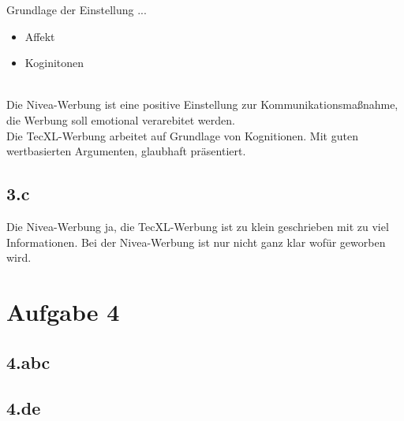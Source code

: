     Grundlage der Einstellung ... 
    \begin{itemize}
        \item Affekt
        \item Koginitonen
    \end{itemize}
    \ \\
    Die Nivea-Werbung ist eine positive Einstellung zur Kommunikationsmaßnahme, die Werbung soll emotional verarebitet werden. \\
    Die TecXL-Werbung arbeitet auf Grundlage von Kognitionen. Mit guten wertbasierten Argumenten, glaubhaft präsentiert.

\subsection*{3.c}
    Die Nivea-Werbung ja, die TecXL-Werbung ist zu klein geschrieben mit zu viel Informationen. Bei der Nivea-Werbung ist nur nicht ganz klar wofür geworben wird.


\section*{Aufgabe 4}
\subsection*{4.abc}

\subsection*{4.de}
